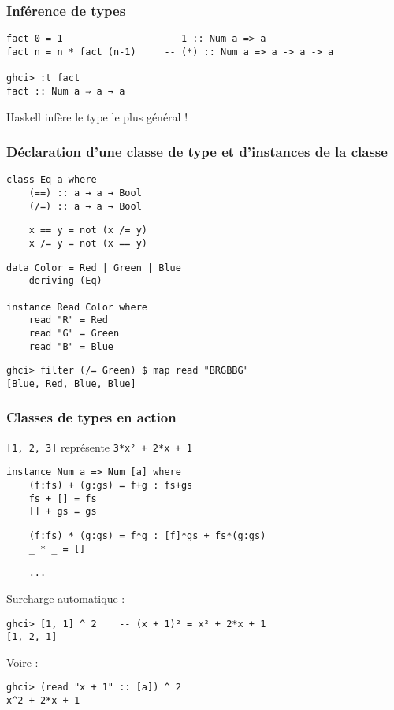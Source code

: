 \documentclass[10pt]{beamer}
\begin{document}
\begin{frame}[fragile]
\frametitle{Inférence de types}

\begin{verbatim}
fact 0 = 1                  -- 1 :: Num a => a
fact n = n * fact (n-1)     -- (*) :: Num a => a -> a -> a

ghci> :t fact
fact :: Num a ⇒ a → a
\end{verbatim}

Haskell infère le type le plus général !
\end{frame}



\begin{frame}[fragile]
\frametitle{Déclaration d'une classe de type et d'instances de la classe}
\begin{verbatim}
class Eq a where
    (==) :: a → a → Bool
    (/=) :: a → a → Bool
\end{verbatim}
\pause
\begin{verbatim}
    x == y = not (x /= y)
    x /= y = not (x == y)
\end{verbatim}
\pause
\begin{verbatim}
data Color = Red | Green | Blue
    deriving (Eq)

instance Read Color where
    read "R" = Red
    read "G" = Green
    read "B" = Blue
\end{verbatim}
\pause
\begin{verbatim}
ghci> filter (/= Green) $ map read "BRGBBG"
[Blue, Red, Blue, Blue]
\end{verbatim}
\end{frame}




\begin{frame}[fragile]
\frametitle{Classes de types en action}

\verb|[1, 2, 3]| représente \verb|3*x² + 2*x + 1|

\begin{verbatim}
instance Num a => Num [a] where
    (f:fs) + (g:gs) = f+g : fs+gs
    fs + [] = fs
    [] + gs = gs
\end{verbatim}
\pause
\begin{verbatim}
    (f:fs) * (g:gs) = f*g : [f]*gs + fs*(g:gs)
    _ * _ = []
\end{verbatim}
\pause
\begin{verbatim}
    ...
\end{verbatim}

Surcharge automatique :

\begin{verbatim}
ghci> [1, 1] ^ 2    -- (x + 1)² = x² + 2*x + 1
[1, 2, 1]
\end{verbatim}

\pause

Voire :

\begin{verbatim}
ghci> (read "x + 1" :: [a]) ^ 2
x^2 + 2*x + 1
\end{verbatim}

\end{frame}
\end{document}
